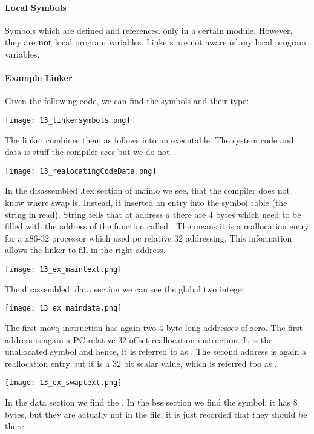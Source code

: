 \paragraph{Local Symbols}
Symbols which are defined and referenced only in a certain module. However, they are \textbf{not} local program variables. Linkers are not aware of any local program variables.

\paragraph{Example Linker}
Given the following code, we can find the symbols and their type:

\texttt{[image: 13\_linkersymbols.png]}

The linker combines them as follows into an executable. The system code and data is stuff the compiler sees but we do not.

\texttt{[image: 13\_realocatingCodeData.png]}

In the disassembled .tex section of main.o we see, that the compiler does not know where swap is. Instead, it inserted an entry into the symbol table (the string in read). String tells that at address $a$ there are $4$ bytes which need to be filled with the address of the function called . The  means it is a reallocation entry for a x86-32 processor which used pc relative $32$ addressing. This information allows the linker to fill in the right address.

\texttt{[image: 13\_ex\_maintext.png]}

The disassembled .data section we can see the global two integer.

\texttt{[image: 13\_ex\_maindata.png]}

The first movq instruction has again two $4$ byte long addresses of zero. The first address is again a PC relative $32$ offset reallocation instruction. It is the unallocated  symbol and hence, it is referred to as . The second address is again a reallocation entry but it is a $32$ bit scalar value, which is referred too as .

\texttt{[image: 13\_ex\_swaptext.png]}

In the data section we find the . In the bss section we find the  symbol. it has $8$ bytes, but they are actually not in the file, it is just recorded that they should be there.

